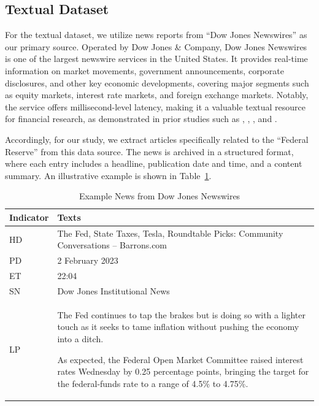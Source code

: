 \subsection*{Textual Dataset}\label{sec:ch3:dataset:text}


For the textual dataset, we utilize news reports from ``Dow Jones Newswires'' as our primary source. Operated by Dow Jones \& Company, Dow Jones Newswires is one of the largest newswire services in the United States. It provides real-time information on market movements, government announcements, corporate disclosures, and other key economic developments, covering major segments such as equity markets, interest rate markets, and foreign exchange markets. Notably, the service offers millisecond-level latency, making it a valuable textual resource for financial research, as demonstrated in prior studies such as \cite{thompson1987attributes}, \cite{mitchell1994impact}, \cite{tetlock2008more}, and \cite{engelberg2012shorts}.

Accordingly, for our study, we extract articles specifically related to the ``Federal Reserve'' from this data source. The news is archived in a structured format, where each entry includes a headline, publication date and time, and a content summary. An illustrative example is shown in Table~\ref{tab:ch3:example_news}.


\begin{table}[htbp]
    \centering
    \footnotesize
    \begin{tabular}{l p{11cm}}
        \toprule
        \textbf{Indicator}& \textbf{Texts} \\
        \midrule
        HD& 	The Fed, State Taxes, Tesla, Roundtable Picks: Community Conversations -- Barrons.com \\
        PD& 	2 February 2023 \\
        ET& 	22:04 \\
        SN& 	Dow Jones Institutional News \\
        LP&     The Fed continues to tap the brakes but is doing so with a lighter touch as it seeks to tame inflation without pushing the economy into a ditch.

        As expected, the Federal Open Market Committee raised interest rates Wednesday by 0.25 percentage points, bringing the target for the federal-funds rate to a range of 4.5\% to 4.75\%.\\
        \bottomrule
    \end{tabular}
    \caption{Example News from Dow Jones Newswires}
    \label{tab:ch3:example_news}
\end{table}



